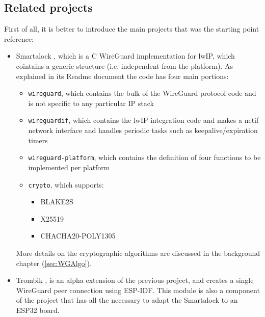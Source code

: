 \subsection{Related projects}
First of all, it is better to introduce the main projects that was the starting point reference:
\begin{itemize}
    \item Smartalock \cite{wg_smartalock}, which is a C WireGuard implementation for lwIP, which cointains a generic structure (i.e. independent from the platform). 
    As explained in its Readme document the code has four main portions:
    \begin{itemize}
        \item \texttt{wireguard}, which contains the bulk of the WireGuard protocol code and is not specific to any particular IP stack
        \item \texttt{wireguardif}, which contains the lwIP integration code and makes a netif network interface and handles periodic tasks such as keepalive/expiration timers
        \item \texttt{wireguard-platform}, which contains the definition of four functions to be implemented per platform 
        \item \texttt{crypto}, which supports:
        \begin{itemize}
            \item BLAKE2S
            \item X25519
            \item CHACHA20-POLY1305  
        \end{itemize}   
    \end{itemize}
More details on the cryptographic algorithms are discussed in the background chapter (\ref{sec:WGAlgo}).
    \item Trombik \cite{wg_trombik}, is an alpha extension of the previous project, and creates a single WireGuard peer connection using ESP-IDF. This module is also a component of the project that has all the necessary to adapt the Smartalock to an ESP32 board. 
\end{itemize}



